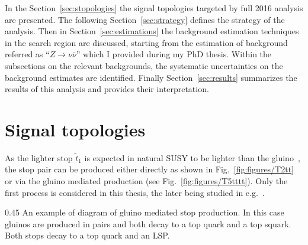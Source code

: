 In the Section~\ref{sec:stopologies} the signal topologies targeted by full 2016 analysis are presented. The following Section~\ref{sec:strategy} defines the strategy of the analysis.  Then in Section~\ref{sec:estimations} the background estimation techniques in the search region are discussed, starting from the estimation of background referred as ``$Z \to \nu \bar{\nu}$'' which I provided during my PhD thesis. Within the subsections on the relevant backgrounds, the systematic uncertainties on the background estimates are identified. Finally Section~\ref{sec:results} summarizes the results of this analysis and provides their interpretation. 







\section{Signal topologies~\label{sec:stopologies}}

As the lighter stop $\tilde{t}_{1}$ is expected in natural SUSY to be lighter than the gluino~\cite{Martin:2008aw}, the stop pair can be produced either directly as shown in Fig.~\ref{fig:figures/T2tt} or via the gluino mediated production (see Fig.~\ref{fig:figures/T5tttt}). Only the first process is considered in this thesis, the later being studied in e.g.~\cite{Sirunyan:2017pjw, Sirunyan:2017kqq}.

                {0.45}       %
                { An example of diagram of gluino mediated stop production. In this case gluinos are produced in pairs and both decay to a top quark and a top squark. Both stops decay to a top quark and an LSP. } %

